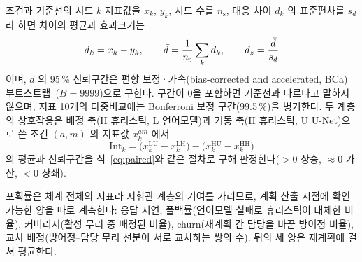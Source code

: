 조건과 기준선의 시드 $k$ 지표값을 $x_k$, $y_k$, 시드 수를 $n_{\mathrm{s}}$, 대응 차이 $d_k$ 의
표준편차를 $s_d$ 라 하면 차이의 평균과 효과크기는
\begin{equation}
d_k = x_k - y_k, \qquad
\bar{d} = \frac{1}{n_{\mathrm{s}}}\sum_{k} d_k, \qquad
d_z = \frac{\bar{d}}{s_d}
\label{eq:paired}
\end{equation}
이며, $\bar{d}$ 의 95\,\% 신뢰구간은 편향 보정·가속(bias-corrected and accelerated, BCa)
부트스트랩~\citep{efron1993bootstrap, diciccio1996bca}($B = 9999$)으로 구한다. 구간이 0을
포함하면 기준선과 다르다고 말하지 않으며, 지표 10개의 다중비교에는 Bonferroni 보정
구간(99.5\,\%)을 병기한다. 두 계층의 상호작용은 배정 축(H 휴리스틱, L 언어모델)과 기동
축(H 휴리스틱, U U-Net)으로 쓴 조건 $(a, m)$ 의 지표값 $x_k^{am}$ 에서
\begin{equation}
\mathrm{Int}_k = \big(x_k^{\mathrm{LU}} - x_k^{\mathrm{LH}}\big)
               - \big(x_k^{\mathrm{HU}} - x_k^{\mathrm{HH}}\big)
\label{eq:interaction}
\end{equation}
의 평균과 신뢰구간을 식~\eqref{eq:paired}와 같은 절차로 구해 판정한다($>0$ 상승,
$\approx 0$ 가산, $<0$ 상쇄).

포획률은 체계 전체의 지표라 지휘관 계층의 기여를 가리므로, 계획 산출 시점에 확인 가능한 양을
따로 계측한다: 응답 지연, 폴백률(언어모델 실패로 휴리스틱이 대체한 비율), 커버리지(활성 무리
중 배정된 비율), churn(재계획 간 담당을 바꾼 방어정 비율), 교차 배정(방어정--담당 무리 선분이
서로 교차하는 쌍의 수). 뒤의 세 양은 재계획에 걸쳐 평균한다.
